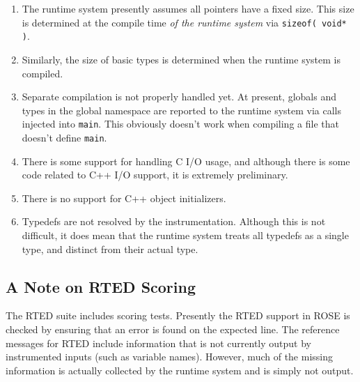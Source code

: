 \begin{enumerate}
    
    \item The runtime system presently assumes all pointers have a fixed size.
    This size is determined at the compile time \emph{of the runtime system} via
    \texttt{sizeof( void* )}.

    \item Similarly, the size of basic types is determined when the runtime
    system is compiled.

    \item Separate compilation is not properly handled yet.  At present, globals
    and types in the global namespace are reported to the runtime system via
    calls injected into \texttt{main}.  This obviously doesn't work when compiling a file
    that doesn't define \texttt{main}.

    \item There is some support for handling C I/O usage, and although there is
    some code related to C++ I/O support, it is extremely preliminary.

    \item There is no support for C++ object initializers.

    \item Typedefs are not resolved by the instrumentation.  Although this is
    not difficult, it does mean that the runtime system treats all typedefs as a
    single type, and distinct from their actual type.

\end{enumerate}

\subsection{A Note on RTED Scoring}

The RTED suite includes scoring tests.  Presently the RTED support in ROSE is
checked by ensuring that an error is found on the expected line.  The reference
messages for RTED include information that is not currently output by
instrumented inputs (such as variable names).  However, much of the missing
information is actually collected by the runtime system and is simply not
output.



